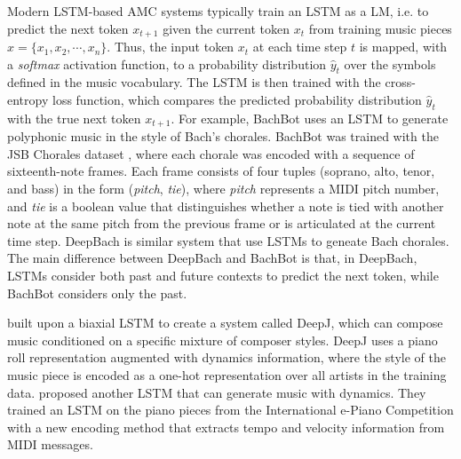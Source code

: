 
Modern LSTM-based AMC systems typically train an LSTM as a LM, i.e. to predict the next token $x_{t+1}$ given the current token $x_t$ from training music pieces $x = \{x_1, x_2, \cdots, x_n\}$. Thus, the input token $x_t$ at each time step $t$ is mapped, with a \textit{softmax} activation function, to a probability distribution $\hat{y}_t$ over the symbols defined in the music vocabulary. The LSTM is then trained with the cross-entropy loss function, which compares the predicted probability distribution $\hat{y}_t$ with the true next token $x_{t+1}$. For example, BachBot \cite{liang2017automatic} uses an LSTM to generate polyphonic music in the style of Bach's chorales. BachBot was trained with the JSB Chorales dataset \cite{boulanger2012modeling}, where each chorale was encoded with a sequence of sixteenth-note frames. Each frame consists of four tuples (soprano, alto, tenor, and bass) in the form (\textit{pitch}, \textit{tie}), where \textit{pitch} represents a MIDI pitch number, and \textit{tie} is a boolean value that distinguishes whether a note is tied with another note at the same pitch from the previous frame or is articulated at the current time step. DeepBach \cite{hadjeres2017deepbach} is similar system that use LSTMs to geneate Bach chorales. The main difference between DeepBach and BachBot is that, in DeepBach, LSTMs consider both past and future contexts to predict the next token, while BachBot considers only the past.


\citet{Mao_2018} built upon a biaxial LSTM \cite{johnson2017generating} to create a system called DeepJ, which can compose music conditioned on a specific mixture of composer styles. DeepJ uses a piano roll representation augmented with dynamics information, where the style of the music piece is encoded as a one-hot representation over all artists in the training data. \citet{oore2017learning} proposed another LSTM that can generate music with dynamics. They trained an LSTM on the piano pieces from the International e-Piano Competition \cite{yamahaEPiano} with a new encoding method that extracts tempo and velocity information from MIDI messages.

